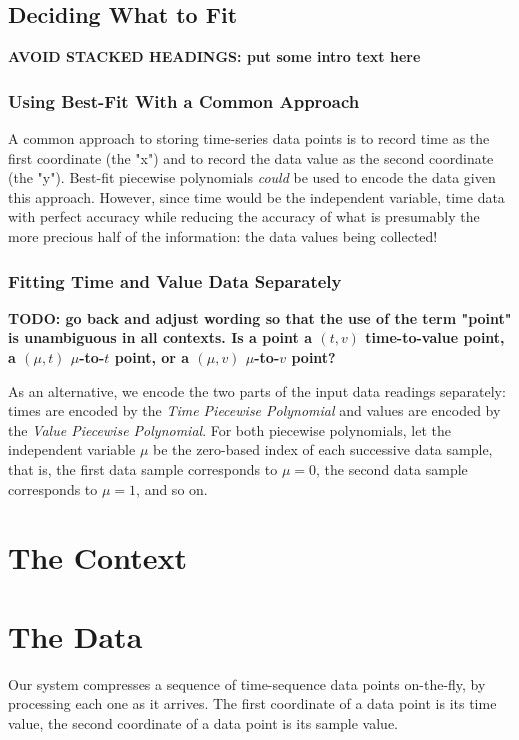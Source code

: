 \documentclass{article}
\begin{document}
\subsection{Deciding What to Fit}
\textbf{AVOID STACKED HEADINGS: put some intro text here}
\subsubsection{Using Best-Fit With a Common Approach}
A common approach to storing time-series data points is to record time as the first coordinate (the "x") and to record the data value as the second coordinate (the "y"). Best-fit piecewise polynomials \textit{could} be used to encode the data given this approach. However, since time would be the independent variable, time data with perfect accuracy while reducing the accuracy of what is presumably the more precious half of the information: the data values being collected!

\subsubsection{Fitting Time and Value Data Separately}
\textbf{TODO: go back and adjust wording so that the use of the term "point" is unambiguous in all contexts. Is a point a \((t,v)\) time-to-value point, a \((\mu,t)\) $\mu$-to-\(t\) point, or a \((\mu,v)\) $\mu$-to-\(v\) point?}

As an alternative, we encode the two parts of the input data readings separately: times are encoded by the \textit{Time Piecewise Polynomial} and values are encoded by the \textit{Value Piecewise Polynomial}. For both piecewise polynomials, let the independent variable $\mu$ be the zero-based index of each successive data sample, that is, the first data sample corresponds to $\mu = 0$, the second data sample corresponds to $\mu = 1$, and so on.



\section{The Context}


\section{The Data}
Our system compresses a sequence of time-sequence data points on-the-fly, by processing each one as it arrives. The first coordinate of a data point is its time value, the second coordinate of a data point is its sample value.
\end{document}
